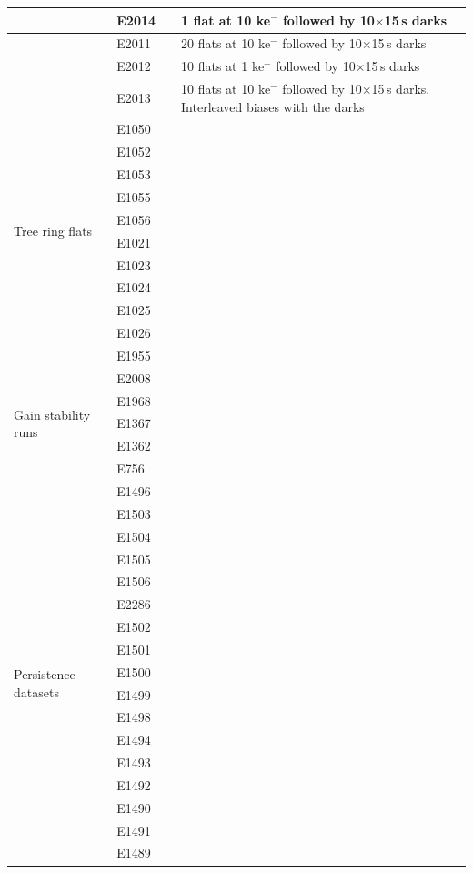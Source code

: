 \begin{longtable}{|p{2cm}|p{2cm}|p{2cm}|p{10cm}|}
& E2014 & & 1 flat at 10 ke$^-$ followed by 10$\times$15\,s darks \\ \hline
& E2011 & & 20 flats at 10 ke$^-$ followed by 10$\times$15\,s darks \\ \hline
& E2012 & & 10 flats at 1 ke$^-$ followed by 10$\times$15\,s darks \\ \hline
& E2013 & & 10 flats at 10 ke$^-$ followed by 10$\times$15\,s darks. Interleaved biases with the darks \\ \hline
\multirow{10}{=}{Tree ring flats} & E1050 & & \\ 
& E1052 & & \\ \hline
& E1053 & & \\ \hline
& E1055 & & \\ \hline
& E1056 & & \\ \hline
& E1021 & & \\ \hline
& E1023 & & \\ \hline
& E1024 & & \\ \hline
& E1025 & & \\ \hline
& E1026 & & \\ \hline
\multirow{7}{=}{Gain stability runs} & E1955 & & \\ 
& E2008 & & \\ \hline
& E1968 & & \\ \hline
& E1367 & & \\ \hline
& E1362 & & \\ \hline
& E756 & & \\ \hline
& E1496 & & \\ \hline
\multirow{25}{=}{Persistence datasets} & E1503 & & \\ 
& E1504 & & \\ \hline
& E1505 & & \\ \hline
& E1506 & & \\ \hline
& E2286 & & \\ \hline
& E1502 & & \\ \hline
& E1501 & & \\ \hline
& E1500 & & \\ \hline
& E1499 & & \\ \hline
& E1498 & & \\ \hline
& E1494 & & \\ \hline
& E1493 & & \\ \hline
& E1492 & & \\ \hline
& E1490 & & \\ \hline
& E1491 & & \\ \hline
& E1489 & & \\ \hline

\end{longtable}
